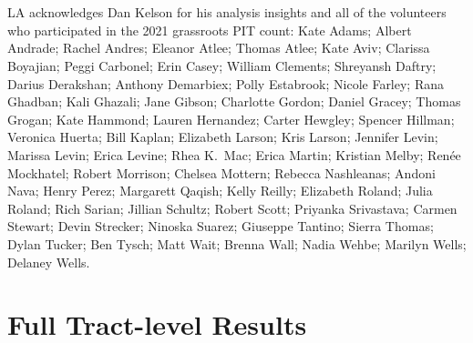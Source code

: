 \documentclass[11pt,twocolumn]{article}
\def\Count{count}
\begin{document}
\section*{}

LA acknowledges Dan Kelson for his analysis insights and all of the volunteers who participated
in the 2021 grassroots PIT \Count: Kate Adams;
Albert Andrade;
Rachel Andres;
Eleanor Atlee;
Thomas Atlee; 
Kate Aviv;
Clarissa Boyajian;
Peggi Carbonel;
Erin Casey;
William Clements;
Shreyansh Daftry;
Darius Derakshan;
Anthony Demarbiex;
Polly Estabrook;
Nicole Farley;
Rana Ghadban;
Kali Ghazali;
Jane Gibson;
Charlotte Gordon;
Daniel Gracey;
Thomas Grogan;
Kate Hammond;
Lauren Hernandez;
Carter Hewgley;
Spencer Hillman;
Veronica Huerta;
Bill Kaplan;
Elizabeth Larson;
Kris Larson;
Jennifer Levin;
Marissa Levin;
Erica Levine;
Rhea K.~Mac;
Erica Martin;
Kristian Melby;
Ren\'{e}e Mockhatel;
Robert Morrison;
Chelsea Mottern;
Rebecca Nashleanas;
Andoni Nava;
Henry Perez;
Margarett Qaqish;
Kelly Reilly;
Elizabeth Roland;
Julia Roland;
Rich Sarian;
Jillian Schultz;
Robert Scott;
Priyanka Srivastava;
Carmen Stewart;
Devin Strecker; 
Ninoska Suarez;
Giuseppe Tantino;
Sierra Thomas; 
Dylan Tucker;
Ben Tysch; 
Matt Wait;
Brenna Wall;
Nadia Wehbe;
Marilyn Wells;
Delaney Wells.

\appendix

\section{Full Tract-level Results}
\end{document}
